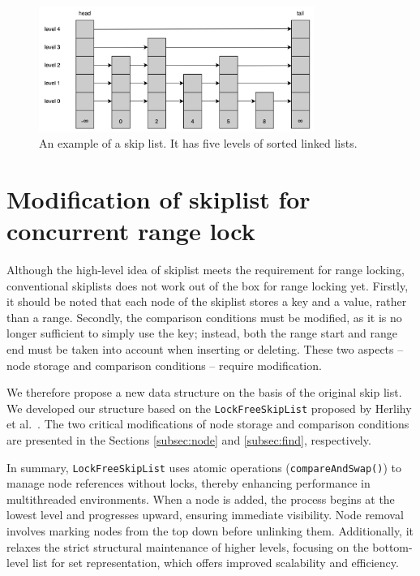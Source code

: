 \begin{figure}[h!]
    \centering
    \includegraphics[width=0.8\textwidth]{./figures/skiplist.png}
    \caption{An example of a skip list. It has five levels of sorted linked lists.}
    \label{fig:skiplist}
\end{figure}

\section{Modification of skiplist for concurrent range lock}

Although the high-level idea of skiplist meets the requirement for range locking, conventional skiplists does not work out of the box for range locking yet. 
Firstly, it should be noted that each node of the skiplist stores a key and a value, rather than a range. 
Secondly, the comparison conditions must be modified, as it is no longer sufficient to simply use the key; instead, both the range start and range end must be taken into account when inserting or deleting. 
These two aspects -- node storage and comparison conditions -- require modification.

We therefore propose a new data structure on the basis of the original skip list.
We developed our structure based on the \texttt{LockFreeSkipList} proposed by Herlihy et al.~\parencite{herlihy2020art}. 
The two critical modifications of node storage and comparison conditions are presented in the Sections \ref{subsec:node} and \ref{subsec:find}, respectively.

In summary, \texttt{LockFreeSkipList} uses atomic operations (\texttt{compareAndSwap()}) to manage node references without locks, thereby enhancing performance in multithreaded environments.
When a node is added, the process begins at the lowest level and progresses upward, ensuring immediate visibility. 
Node removal involves marking nodes from the top down before unlinking them. 
Additionally, it relaxes the strict structural maintenance of higher levels, focusing on the bottom-level list for set representation, which offers improved scalability and efficiency.

